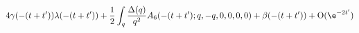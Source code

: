 \begin{equation}
4 \gamma (-(t+t')) \lambda (-(t+t')) + \frac{1}{2} \int_q \frac{\Delta
(q)}{q^2} A_6 (-(t+t'); q,-q,0,0,0,0) + \beta (-(t+t')) + \text{O}
(\e^{-2t'})
\end{equation}

